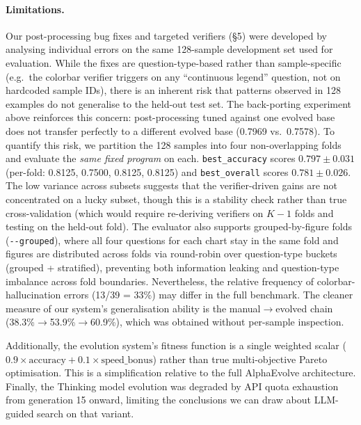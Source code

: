 \documentclass{article}
\begin{document}
\paragraph{Limitations.}
Our post-processing bug fixes and targeted verifiers (\S5) were developed by
analysing individual errors on the same 128-sample development set used for
evaluation. While the fixes are question-type-based rather than
sample-specific (e.g.\ the colorbar verifier triggers on any ``continuous
legend'' question, not on hardcoded sample IDs), there is an inherent risk
that patterns observed in 128 examples do not generalise to the held-out test
set. The back-porting experiment above reinforces this concern:
post-processing tuned against one evolved base does not transfer perfectly
to a different evolved base (0.7969 vs.\ 0.7578).  To quantify this risk, we partition the 128 samples into four
non-overlapping folds and evaluate the \emph{same fixed program} on each.
\texttt{best\_accuracy} scores $0.797 \pm 0.031$ (per-fold:
0.8125, 0.7500, 0.8125, 0.8125) and \texttt{best\_overall} scores
$0.781 \pm 0.026$. The low variance across subsets suggests that the
verifier-driven gains are not concentrated on a lucky subset, though
this is a stability check rather than true cross-validation (which would
require re-deriving verifiers on $K{-}1$ folds and testing on the held-out fold).
The evaluator also supports grouped-by-figure folds
(\texttt{-{}-grouped}), where all four questions for each chart stay in
the same fold and figures are distributed across folds via round-robin
over question-type buckets (grouped + stratified), preventing both
information leaking and question-type imbalance across fold boundaries.
Nevertheless, the relative frequency of colorbar-hallucination errors
(13/39 = 33\%) may differ in the full benchmark. The cleaner measure of our
system's generalisation ability is the manual$\to$evolved chain
(38.3\%$\to$53.9\%$\to$60.9\%), which was obtained without per-sample
inspection.

Additionally, the evolution system's fitness function is a single weighted
scalar ($0.9 \times \text{accuracy} + 0.1 \times \text{speed\_bonus}$)
rather than true multi-objective Pareto optimisation. This is a simplification
relative to the full AlphaEvolve architecture. Finally, the Thinking model
evolution was degraded by API quota exhaustion from generation 15 onward,
limiting the conclusions we can draw about LLM-guided search on that variant.
\end{document}
